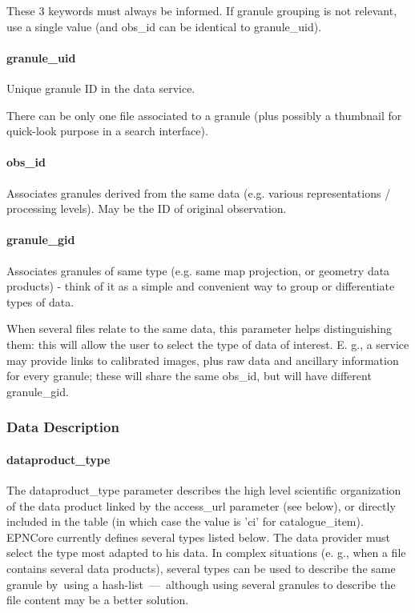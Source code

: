 \documentclass[11pt,a4paper]{ivoa}
\begin{document}
These 3 keywords must always be informed. If granule grouping is not relevant, use a single value (and obs\_id can be identical to granule\_uid).

\paragraph{granule\_uid}

Unique granule ID in the data service.

There can be only one file associated to a granule (plus possibly a thumbnail for quick-look purpose in a search interface).

\paragraph{obs\_id}

Associates granules derived from the same data (e.g. various representations / processing levels). May be the ID of original observation.

\paragraph{granule\_gid}

Associates granules of same type (e.g. same map projection, or geometry data products) - think of it as a simple and convenient way to group or differentiate types of data.

When several files relate to the same data, this parameter helps distinguishing them: this will allow the user to select the type of data of interest. E. g., a service may provide links to calibrated images, plus raw data and ancillary information for every granule; these will share the same obs\_id, but will have different granule\_gid.

\subsubsection{Data Description}

\paragraph{dataproduct\_type}

The dataproduct\_type parameter describes the high level scientific organization of the data product linked by the access\_url parameter (see below), or directly included in the table (in which case the value is 'ci' for catalogue\_item). EPNCore currently defines several types listed below. The data provider must select the type most adapted to his data. In complex situations (e. g., when a file contains several data products), several types can be used to describe the same granule by using a hash-list — although using several granules to describe the file content may be a better solution.  
\end{document}
